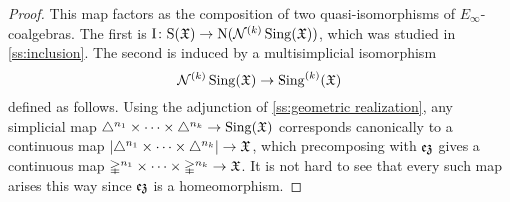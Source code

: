 \begin{proof}
	This map factors as the composition of two quasi-isomorphisms of $E_\infty$-coalgebras.
	The first is $\operatorname{I} \colon \mathrm{S}(\mathfrak{X}) \to \operatorname{N}(\mathcal{N}^{(k)} \operatorname{Sing}(\mathfrak{X}))$, which was studied in \cref{ss:inclusion}.
	The second is induced by a multisimplicial isomorphism
	\[
	\mathcal{N}^{(k)} \operatorname{Sing}(\mathfrak{X}) \to \operatorname{Sing}^{(k)}(\mathfrak{X})
	\]
	defined as follows.
	Using the adjunction of \cref{ss:geometric realization}, any simplicial map $\triangle^{n_1}\times\dots\times\triangle^{n_k} \to \operatorname{Sing}(\mathfrak{X})$ corresponds canonically to a continuous map $\lvert\triangle^{n_1}\times\dots\times\triangle^{n_k}\rvert \to \mathfrak{X}$, which precomposing with $\operatorname{\mathfrak{ez}}$ gives a continuous map $\mathbb{\Delta}^{n_1}\times\dots\times\mathbb{\Delta}^{n_k} \to \mathfrak{X}$.
	It is not hard to see that every such map arises this way since $\operatorname{\mathfrak{ez}}$ is a homeomorphism.
\end{proof}